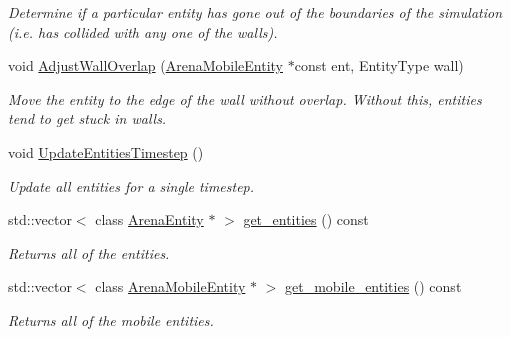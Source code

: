 \begin{DoxyCompactItemize}
\begin{DoxyCompactList}\small\item\em Determine if a particular entity has gone out of the boundaries of the simulation (i.\+e. has collided with any one of the walls). \end{DoxyCompactList}\item 
\mbox{\label{class_arena_a51c1e99dfd9a618c6041fd22d0a11959}} 
void \mbox{\hyperlink{class_arena_a51c1e99dfd9a618c6041fd22d0a11959}{Adjust\+Wall\+Overlap}} (\mbox{\hyperlink{class_arena_mobile_entity}{Arena\+Mobile\+Entity}} $\ast$const ent, Entity\+Type wall)
\begin{DoxyCompactList}\small\item\em Move the entity to the edge of the wall without overlap. Without this, entities tend to get stuck in walls. \end{DoxyCompactList}\item 
void \mbox{\hyperlink{class_arena_a682ec81cb30e36e5bb801b3388bcb494}{Update\+Entities\+Timestep}} ()
\begin{DoxyCompactList}\small\item\em Update all entities for a single timestep. \end{DoxyCompactList}\item 
\mbox{\label{class_arena_a952408e8197790a034b75a4e275bcbc2}} 
std\+::vector$<$ class \mbox{\hyperlink{class_arena_entity}{Arena\+Entity}} $\ast$ $>$ \mbox{\hyperlink{class_arena_a952408e8197790a034b75a4e275bcbc2}{get\+\_\+entities}} () const
\begin{DoxyCompactList}\small\item\em Returns all of the entities. \end{DoxyCompactList}\item 
\mbox{\label{class_arena_a40a7597d65a8ed5020aba4025b35617b}} 
std\+::vector$<$ class \mbox{\hyperlink{class_arena_mobile_entity}{Arena\+Mobile\+Entity}} $\ast$ $>$ \mbox{\hyperlink{class_arena_a40a7597d65a8ed5020aba4025b35617b}{get\+\_\+mobile\+\_\+entities}} () const
\begin{DoxyCompactList}\small\item\em Returns all of the mobile entities. \end{DoxyCompactList}\item 
\mbox{\label{class_arena_a5e3be20f2c67338a5a684b85a66f6b96}} 

\end{DoxyCompactItemize}
